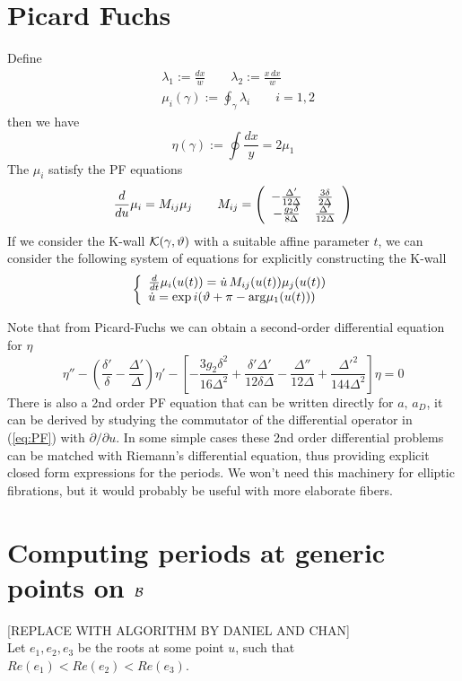 \documentclass[11pt]{article}
\newcommand{\be}{\begin{equation}}
\newcommand{\ee}{\end{equation}}
\newcommand{\CK}{{\cal K}}
\begin{document}
\section{Picard Fuchs}
Define
\be
\begin{split}
	& \lambda_{1} := \frac{dx}{w}\qquad \lambda_{2} := \frac{x\, dx}{w} \\
	& \mu_{i}(\gamma) :=\oint_{\gamma}\lambda_{i} \qquad i=1,2
\end{split}
\ee
then we have 
\be
	\eta(\gamma):=\oint\frac{dx}{y} = 2\mu_{1}
\ee
The $\mu_{i}$ satisfy the PF equations
\be
	{d\over du}{\mu_{i}} = M_{ij} {\mu_{j}}%
	\qquad M_{ij} = \left(\begin{array}{cc} %
	-{\Delta' \over 12 \Delta} & {3\delta \over 2\Delta} \\
	-{g_{2} \delta \over 8 \Delta} & {\Delta' \over 12\Delta}
	\end{array}\right)
\ee
If we consider the K-wall $\CK(\gamma,\vartheta)$ with a suitable affine parameter $t$, we can consider the following system of equations for explicitly constructing the K-wall
\be
\left\{\begin{array}{l}
	{d\over dt}{\mu_{i}(u(t))}= {\dot u}\,M_{ij}(u(t)) {\mu_{j}}(u(t)) \\
	\dot u = \exp{i(\vartheta+\pi - {\rm arg}\mu_{1}(u(t)))}
\end{array}\right.
\ee

Note that from Picard-Fuchs we can obtain a second-order differential equation for $\eta_{}$
\be
	\eta{''}-\left(\frac{\delta'}{\delta}-\frac{\Delta'}{\Delta}\right)\eta'-\left[-\frac{3 g_2 \delta ^2}{16 \Delta ^2}+\frac{\delta ' \Delta '}{12 \delta \Delta }-\frac{\Delta ''}{12 \Delta}+\frac{\Delta'^2}{144 \Delta^2}\right]\eta=0 \label{eq:PF}
\ee
There is also a 2nd order PF equation that can be written directly for $a,\,a_{D}$, it can be derived by studying the commutator of the differential operator in (\ref{eq:PF}) with $\partial/\partial u$.
In some simple cases these 2nd order differential problems can be matched with Riemann's differential equation, thus providing explicit closed form expressions for the periods. We won't need this machinery for elliptic fibrations, but it would probably be useful with more elaborate fibers.



\section{Computing periods at generic points on ${\cal B}$}
[REPLACE WITH ALGORITHM BY DANIEL AND CHAN]\\
Let $e_{1},e_{2},e_{3}$ be the roots at some point $u$, such that $Re(e_{1})<Re(e_{2})<Re(e_{3})$.
\end{document}
